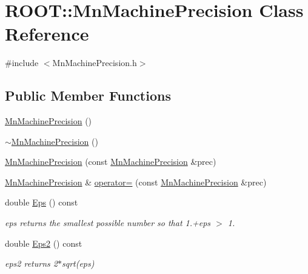 \hypertarget{classROOT_1_1Minuit2_1_1MnMachinePrecision}{}\section{R\+O\+OT\+:\+:Mn\+Machine\+Precision Class Reference}
\label{classROOT_1_1Minuit2_1_1MnMachinePrecision}


{\ttfamily \#include $<$Mn\+Machine\+Precision.\+h$>$}

\subsection*{Public Member Functions}
\begin{DoxyCompactItemize}
\item 
\mbox{\hyperlink{classROOT_1_1Minuit2_1_1MnMachinePrecision_aa40e069e8ca7ffc87ac53cdfebaf6316}{Mn\+Machine\+Precision}} ()
\item 
\mbox{\hyperlink{classROOT_1_1Minuit2_1_1MnMachinePrecision_abcef7b80562b246252decc15b6fabc71}{$\sim$\+Mn\+Machine\+Precision}} ()
\item 
\mbox{\hyperlink{classROOT_1_1Minuit2_1_1MnMachinePrecision_a7b8520f8d3479d7dd1b91a3bc3236281}{Mn\+Machine\+Precision}} (const \mbox{\hyperlink{classROOT_1_1Minuit2_1_1MnMachinePrecision}{Mn\+Machine\+Precision}} \&prec)
\item 
\mbox{\hyperlink{classROOT_1_1Minuit2_1_1MnMachinePrecision}{Mn\+Machine\+Precision}} \& \mbox{\hyperlink{classROOT_1_1Minuit2_1_1MnMachinePrecision_a89ded7be0c8fe34ad55585e45a078355}{operator=}} (const \mbox{\hyperlink{classROOT_1_1Minuit2_1_1MnMachinePrecision}{Mn\+Machine\+Precision}} \&prec)
\item 
double \mbox{\hyperlink{classROOT_1_1Minuit2_1_1MnMachinePrecision_a3a56da6043c5df1a98e5c8b1aa9f6d9f}{Eps}} () const
\begin{DoxyCompactList}\small\item\em eps returns the smallest possible number so that 1.+eps $>$ 1. \end{DoxyCompactList}\item 
double \mbox{\hyperlink{classROOT_1_1Minuit2_1_1MnMachinePrecision_aa71de131bc08f19d18dfeba4cb8191ce}{Eps2}} () const
\begin{DoxyCompactList}\small\item\em eps2 returns 2$\ast$sqrt(eps) \end{DoxyCompactList}\item 

\end{DoxyCompactItemize}
